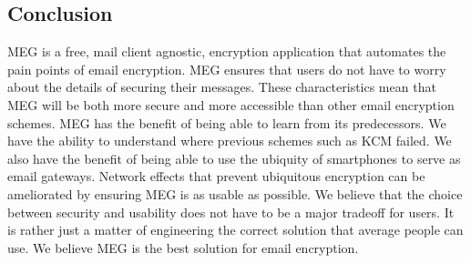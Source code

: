 \documentclass[10pt]{article}
\begin{document}
\begin{multicols}{2}
\section{Conclusion}
\par MEG is a free, mail client agnostic, encryption application that automates the pain points of email encryption. MEG ensures that users do not have to worry about the details of securing their messages. These characteristics mean that MEG will be both more secure and more accessible than other email encryption schemes. MEG has the benefit of being able to learn from its predecessors. We have the ability to understand where previous schemes such as KCM failed. We also have the benefit of being able to use the ubiquity of smartphones to serve as email gateways. Network effects that prevent ubiquitous encryption can be ameliorated by ensuring MEG is as usable as possible. We believe that the choice between security and usability does not have to be a major tradeoff for users. It is rather just a matter of engineering the correct solution that average people can use. We believe MEG is the best solution for email encryption.



\end{multicols}
\end{document}
